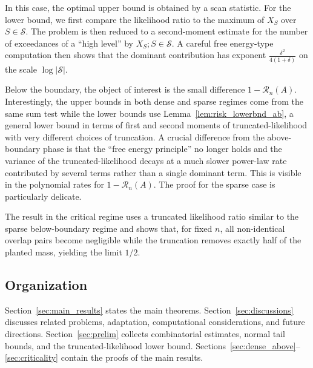 \documentclass[11pt,reqno,letterpaper]{amsart}
\numberwithin{equation}{section}
\theoremstyle{plain}
\begin{document}
\vspace{0.1cm}

 In this case, the optimal upper bound is obtained by a scan statistic. For the lower bound, we first compare the 
likelihood ratio to the maximum of $X_S$ over $S\in\mathcal S$. The problem is then 
reduced to a second-moment estimate for the number of exceedances of a ``high level'' by $X_S; S \in \mathcal S$. A careful free energy-type computation then 
shows that the dominant contribution has exponent $\frac{\delta^2}{4(1+\delta)}$ on 
the scale $\log|\mathcal S|$.

\vspace{0.1cm}

 Below the boundary, the object of interest is the small difference $1-\mathcal R_n(A)$. Interestingly, the upper bounds in both dense and sparse regimes 
come from the same sum test while the lower bounds use 
Lemma~\ref{lem:risk_lowerbnd_ab}, a general lower bound in terms of first and second 
moments of truncated-likelihood with very different choices of truncation. A crucial 
difference from the above-boundary phase is that the ``free energy principle'' no 
longer holds and the variance of the truncated-likelihood decays at a much slower 
power-law rate contributed by several terms rather than a single dominant term. This 
is visible in the polynomial rates for $1 - \mathcal R_n(A)$. The proof for the 
sparse case is particularly delicate.

\vspace{0.1cm}

 The result in the critical regime uses 
a truncated likelihood ratio similar to the sparse below-boundary regime and shows that, for fixed $n$, all non-identical overlap pairs become negligible while the 
truncation removes exactly half of the planted mass, yielding the limit $1/2$.

\subsection{Organization} Section~\ref{sec:main_results} states the main theorems.  Section~\ref{sec:discussions} discusses related problems, adaptation, computational considerations, and future directions. Section~\ref{sec:prelim} collects combinatorial estimates, normal tail bounds, and the truncated-likelihood lower bound. Sections~\ref{sec:dense_above}--\ref{sec:criticality} contain the proofs of the main results.
\end{document}
